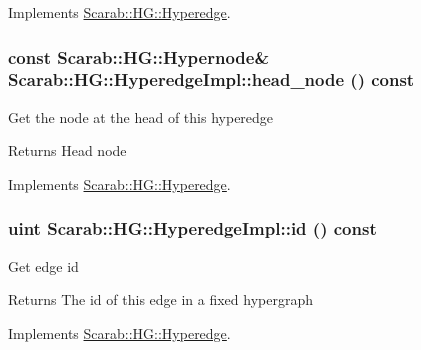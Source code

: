 Implements \hyperlink{classScarab_1_1HG_1_1Hyperedge_a0d201ddb955631aadee4c15cc8e709f8}{Scarab::HG::Hyperedge}.

\hypertarget{classScarab_1_1HG_1_1HyperedgeImpl_ae194bfc8ecac2a12791fa36c1c2c62a7}{
\subsubsection[{head\_\-node}]{\setlength{\rightskip}{0pt plus 5cm}const {\bf Scarab::HG::Hypernode}\& Scarab::HG::HyperedgeImpl::head\_\-node () const}}
\label{classScarab_1_1HG_1_1HyperedgeImpl_ae194bfc8ecac2a12791fa36c1c2c62a7}
Get the node at the head of this hyperedge

\begin{DoxyReturn}{Returns}
Head node 
\end{DoxyReturn}


Implements \hyperlink{classScarab_1_1HG_1_1Hyperedge_a6043de341070c103d811f5286193dd46}{Scarab::HG::Hyperedge}.

\hypertarget{classScarab_1_1HG_1_1HyperedgeImpl_afa81943347267781c25c4e68f7f5f547}{
\subsubsection[{id}]{\setlength{\rightskip}{0pt plus 5cm}uint Scarab::HG::HyperedgeImpl::id () const}}
\label{classScarab_1_1HG_1_1HyperedgeImpl_afa81943347267781c25c4e68f7f5f547}
Get edge id

\begin{DoxyReturn}{Returns}
The id of this edge in a fixed hypergraph 
\end{DoxyReturn}


Implements \hyperlink{classScarab_1_1HG_1_1Hyperedge_af824beb7107253a7545b35992c17e057}{Scarab::HG::Hyperedge}.

